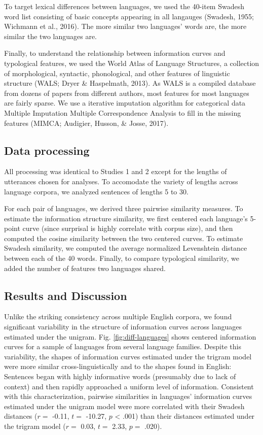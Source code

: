 \documentclass[10pt, letterpaper]{article}
\begin{document}
To target lexical differences between languages, we used the 40-item
Swadesh word list consisting of basic concepts appearing in all
langauges (Swadesh, 1955; Wichmann et al., 2016). The more similar two
languages' words are, the more similar the two languages are.

Finally, to understand the relationship between information curves and
typological features, we used the World Atlas of Language Structures, a
collection of morphological, syntactic, phonological, and other features
of linguistic structure (WALS; Dryer \& Haspelmath, 2013). As WALS is a
compiled database from dozens of papers from different authors, most
features for most languages are fairly sparse. We use a iterative
imputation algorithm for categorical data Multiple Imputation Multiple
Correspondence Analysis to fill in the missing features (MIMCA;
Audigier, Husson, \& Josse, 2017).

\hypertarget{data-processing-1}{%
\subsection{Data processing}\label{data-processing-1}}

All processing was identical to Studies 1 and 2 except for the lengths
of utterances chosen for analyses. To accomodate the variety of lengths
across language corpora, we analyzed sentences of lengths 5 to 30.

For each pair of languages, we derived three pairwise similarity
measures. To estimate the information structure similarity, we first
centered each language's 5-point curve (since surprisal is highly
correlate with corpus size), and then computed the cosine similarity
between the two centered curves. To estimate Swadesh similarity, we
computed the average normalized Levenshtein distance between each of the
40 words. Finally, to compare typological similarity, we added the
number of features two languages shared.

\hypertarget{results-and-discussion-2}{%
\subsection{Results and Discussion}\label{results-and-discussion-2}}

Unlike the striking consistency across multiple English corpora, we
found significant variability in the structure of information curves
across languages estimated under the unigram. Fig.
\ref{fig:diff-languages} shows centered information curves for a sample
of languages from several language families. Despite this variability,
the shapes of information curves estimated under the trigram model were
more similar cross-linguistically and to the shapes found in English:
Sentences began with highly informative words (presumably due to lack of
context) and then rapidly approached a uniform level of information.
Consistent with this characterization, pairwise similarities in
languages' information curves estimated under the unigram model were
more correlated with their Swadesh distances (\(r =\) -0.11, \(t =\)
-10.27, \(p\) \textless{} .001) than their distances estimated under the
trigram model (\(r =\) 0.03, \(t =\) 2.33, \(p =\) .020).
\end{document}
